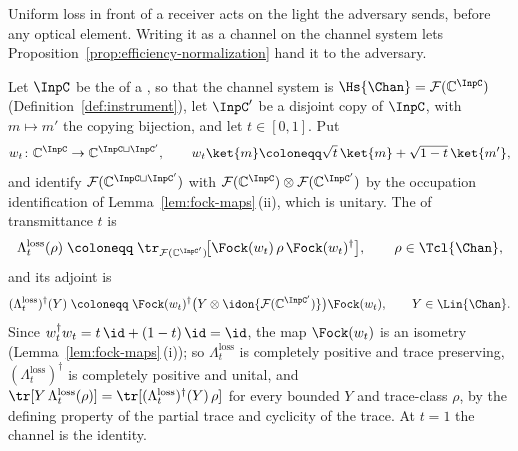 
Uniform loss in front of a receiver acts on the light the adversary sends,
before any optical element. Writing it as a channel on the channel system lets
Proposition~\ref{prop:efficiency-normalization} hand it to the adversary.

\begin{definition}\label{def:pure-loss}
Let $\InpC$ be the  of a , so
that the channel system is $\Hs{\Chan}=\mathcal{F}(\mathbb{C}^{\InpC})$
(Definition~\ref{def:instrument}), let $\InpC'$ be a disjoint copy of
$\InpC$, with $m\mapsto m'$ the copying bijection, and let $t\in[0,1]$. Put
\begin{equation}\label{eq:lossiso}
  w_t\colon\mathbb{C}^{\InpC}\to\mathbb{C}^{\InpC\sqcup\InpC'},\qquad
  w_t\ket{m}\coloneqq\sqrt{t}\,\ket{m}+\sqrt{1-t}\,\ket{m'} ,
\end{equation}
and identify $\mathcal{F}(\mathbb{C}^{\InpC\sqcup\InpC'})$ with
$\mathcal{F}(\mathbb{C}^{\InpC})\otimes\mathcal{F}(\mathbb{C}^{\InpC'})$ by
the occupation identification of Lemma~\ref{lem:fock-maps}\,(ii),
which is unitary. The
of transmittance $t$ is
\begin{equation}\label{eq:pureloss}
  \Lambda^{\mathrm{loss}}_t(\rho)\;\coloneqq\;
  \tr_{\mathcal{F}(\mathbb{C}^{\InpC'})}\!\big[\Fock(w_t)\,\rho\,\Fock(w_t)^{\dagger}\big],
  \qquad \rho\in\Tcl{\Chan},
\end{equation}
and its adjoint is
\begin{equation}\label{eq:purelossadj}
  (\Lambda^{\mathrm{loss}}_t)^{\dagger}(Y)\;\coloneqq\;
  \Fock(w_t)^{\dagger}\big(Y\otimes\idon{\mathcal{F}(\mathbb{C}^{\InpC'})}\big)\Fock(w_t),
  \qquad Y\in\Lin{\Chan}.
\end{equation}
Since $w_t^{\dagger}w_t=t\,\id+(1-t)\,\id=\id$, the map $\Fock(w_t)$ is an
isometry (Lemma~\ref{lem:fock-maps}\,(i)); so $\Lambda^{\mathrm{loss}}_t$ is completely positive and trace
preserving, $(\Lambda^{\mathrm{loss}}_t)^{\dagger}$ is completely positive and
unital, and
$\tr[Y\,\Lambda^{\mathrm{loss}}_t(\rho)]=\tr[(\Lambda^{\mathrm{loss}}_t)^{\dagger}(Y)\,\rho]$
for every bounded $Y$ and trace-class $\rho$, by the defining property of the
partial trace and cyclicity of the trace. At $t=1$ the channel is the
identity.
\end{definition}

